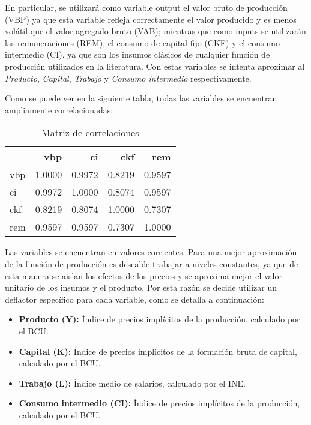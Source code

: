 \documentclass[
]{article}
\providecommand{\tightlist}{%
  \setlength{\itemsep}{0pt}\setlength{\parskip}{0pt}}
\begin{document}
En particular, se utilizará como variable output el valor bruto de
producción (VBP) ya que esta variable refleja correctamente el valor
producido y es menos volátil que el valor agregado bruto (VAB); mientras
que como inputs se utilizarán las remuneraciones (REM), el consumo de
capital fijo (CKF) y el consumo intermedio (CI), ya que son los insumos
clásicos de cualquier función de producción utilizados en la literatura.
Con estas variables se intenta aproximar al \emph{Producto},
\emph{Capital}, \emph{Trabajo} y \emph{Consumo intermedio}
respectivamente.

Como se puede ver en la siguiente tabla, todas las variables se
encuentran ampliamente correlacionadas:

\begin{table}[H]

\caption{\label{tab:unnamed-chunk-1}Matriz de correlaciones}
\centering
\begin{tabular}[t]{lrrrr}
\toprule
  & vbp & ci & ckf & rem\\
\midrule
\rowcolor{gray!6}  vbp & 1.0000 & 0.9972 & 0.8219 & 0.9597\\
ci & 0.9972 & 1.0000 & 0.8074 & 0.9597\\
\rowcolor{gray!6}  ckf & 0.8219 & 0.8074 & 1.0000 & 0.7307\\
rem & 0.9597 & 0.9597 & 0.7307 & 1.0000\\
\bottomrule
\end{tabular}
\end{table}

Las variables se encuentran en valores corrientes. Para una mejor
aproximación de la función de producción es deseable trabajar a niveles
constantes, ya que de esta manera se aislan los efectos de los precios y
se aproxima mejor el valor unitario de los insumos y el producto. Por
esta razón se decide utilizar un deflactor específico para cada
variable, como se detalla a continuación:

\begin{itemize}
\tightlist
\item
  \textbf{Producto (Y):} Índice de precios implícitos de la producción,
  calculado por el BCU.
\item
  \textbf{Capital (K):} Índice de precios implícitos de la formación
  bruta de capital, calculado por el BCU.
\item
  \textbf{Trabajo (L):} Índice medio de salarios, calculado por el INE.
\item
  \textbf{Consumo intermedio (CI):} Índice de precios implícitos de la
  producción, calculado por el BCU.
\end{itemize}
\end{document}
